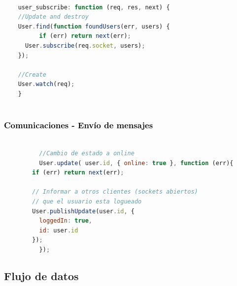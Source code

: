 \documentclass[xcolor=x11names,compress]{beamer}
\theoremstyle{cuadrado}
\begin{document}
{\begin{frame}[fragile]
\begin{adjustwidth}{-2em}{-1em}
  \begin{lstlisting}[language=JavaScript]

    user_subscribe: function (req, res, next) {
	//Update and destroy
	User.find(function foundUsers(err, users) {
          if (err) return next(err);
	  User.subscribe(req.socket, users);
	});

	//Create
	User.watch(req);
    }
    
  \end{lstlisting}
\end{adjustwidth}

\end{frame}



\begin{frame}[fragile]
\frametitle{\textcolor{black}{ Comunicaciones - Envío de mensajes }}


\begin{adjustwidth}{-8em}{-1em}
      \begin{lstlisting}[language=JavaScript]

	      //Cambio de estado a online
	      User.update( user.id, { online: true }, function (err){
		if (err) return next(err);

		// Informar a otros clientes (sockets abiertos) 
		// que el usuario esta logueado
		User.publishUpdate(user.id, {
		  loggedIn: true,
		  id: user.id
		});
	      });

      \end{lstlisting}
\end{adjustwidth}

\end{frame}



\subsection{Flujo de datos}

}
\end{document}
